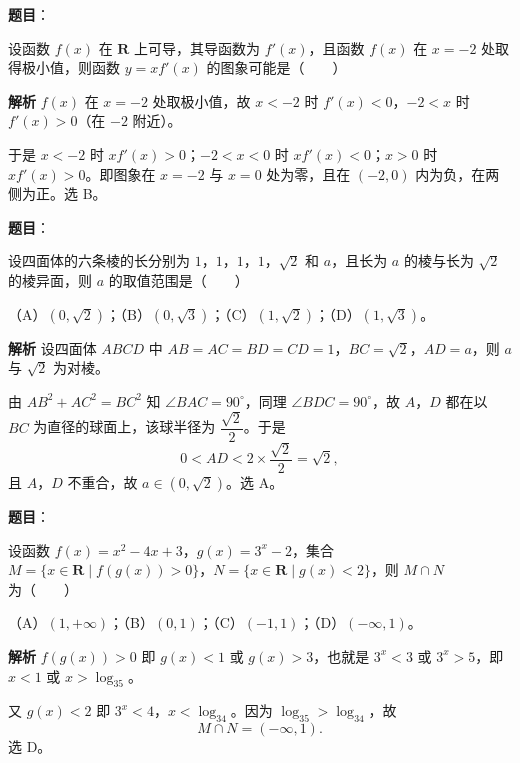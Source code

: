 \begin{answer}

\textbf{题目}：

设函数 $f(x)$ 在 $\mathbf R$ 上可导，其导函数为 $f'(x)$，且函数 $f(x)$ 在 $x=-2$ 处取得极小值，则函数 $y=xf'(x)$ 的图象可能是\mbox{（　　）}
\nopagebreak[4]
\begin{center}\end{center}
\nopagebreak[4]
\textbf{解析}
$f(x)$ 在 $x=-2$ 处取极小值，故 $x<-2$ 时 $f'(x)<0$，$-2<x$ 时 $f'(x)>0$（在 $-2$ 附近）。

于是 $x<-2$ 时 $xf'(x)>0$；$-2<x<0$ 时 $xf'(x)<0$；$x>0$ 时 $xf'(x)>0$。即图象在 $x=-2$ 与 $x=0$ 处为零，且在 $(-2,0)$ 内为负，在两侧为正。选 B。


\end{answer}
\begin{answer}

\textbf{题目}：

设四面体的六条棱的长分别为 $1$，$1$，$1$，$1$，$\sqrt2$ 和 $a$，且长为 $a$ 的棱与长为 $\sqrt2$ 的棱异面，则 $a$ 的取值范围是\mbox{（　　）}

（A）$\left(0,\sqrt2\right)$；（B）$\left(0,\sqrt3\right)$；（C）$\left(1,\sqrt2\right)$；（D）$\left(1,\sqrt3\right)$。

\textbf{解析}
设四面体 $ABCD$ 中 $AB=AC=BD=CD=1$，$BC=\sqrt2$，$AD=a$，则 $a$ 与 $\sqrt2$ 为对棱。

由 $AB^2+AC^2=BC^2$ 知 $\angle BAC=90^\circ$，同理 $\angle BDC=90^\circ$，故 $A$，$D$ 都在以 $BC$ 为直径的球面上，该球半径为 $\dfrac{\sqrt2}2$。于是
\nopagebreak[4]
\[0<AD<2\times\frac{\sqrt2}2=\sqrt2,\]
且 $A$，$D$ 不重合，故 $a\in\left(0,\sqrt2\right)$。选 A。


\end{answer}
\begin{answer}

\textbf{题目}：

设函数 $f(x)=x^2-4x+3$，$g(x)=3^x-2$，集合 $M=\{x\in\mathbf R\mid f(g(x))>0\}$，$N=\{x\in\mathbf R\mid g(x)<2\}$，则 $M\cap N$ 为\mbox{（　　）}

（A）$(1,+\infty)$；（B）$(0,1)$；（C）$(-1,1)$；（D）$(-\infty,1)$。

\textbf{解析}
$f(g(x))>0$ 即 $g(x)<1$ 或 $g(x)>3$，也就是 $3^x<3$ 或 $3^x>5$，即 $x<1$ 或 $x>\log_35$。

又 $g(x)<2$ 即 $3^x<4$，$x<\log_34$。因为 $\log_35>\log_34$，故
\nopagebreak[4]
\[M\cap N=(-\infty,1).\]
选 D。


\end{answer}
